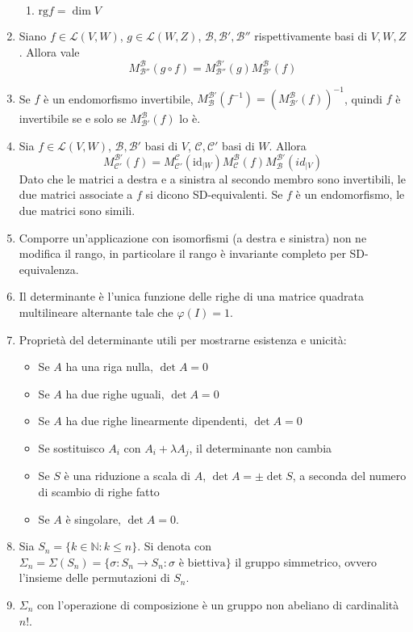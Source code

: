 \documentclass[a4paper,11pt]{article}
\newcommand{\base}[1]{\mathcal{#1}}				%
\newcommand{\rg}{\mathrm{rg}}						%
\begin{document}
\begin{enumerate}[resume]
\begin{enumerate}
		\item $\rg f=\dim V$
	\end{enumerate}
	\item Siano $f\in\mathcal{L}(V,W)$, $g\in\mathcal{L}(W,Z)$, $\base{B},\base{B'},\base{B''}$ rispettivamente basi di $V,W,Z$. Allora vale
	\[M_{\base{B''}}^{\base{B}}(g\circ f)=M_{\base{B''}}^{\base{B'}}(g)M_{\base{B'}}^{\base{B}}(f)\]
	\item Se $f$ è un endomorfismo invertibile, $M_{\base{B}}^{\base{B'}}(f^{-1})=\left(M_{\base{B'}}^{\base{B}}(f)\right)^{-1}$, quindi $f$ è invertibile se e solo se $M_{\base{B'}}^{\base{B}}(f)$ lo è.
	\item Sia $f\in\mathcal{L}(V,W)$, $\base{B},\base{B'}$ basi di $V$, $\base{C},\base{C'}$ basi di $W$. Allora
	\[M_{\base{C'}}^{\base{B'}}(f)=M_{\base{C'}}^{\base{C}}(\mathrm{id}_{|W})M_{\base{C}}^{\base{B}}(f)M_{\base{B}}^{\base{B'}}(id_{|V})\]
	Dato che le matrici a destra e a sinistra al secondo membro sono invertibili, le due matrici associate a $f$ si dicono SD-equivalenti. Se $f$ è un endomorfismo, le due matrici sono simili.
	\item Comporre un'applicazione con isomorfismi (a destra e sinistra) non ne modifica il rango, in particolare il rango è invariante completo per SD-equivalenza.
	\item Il determinante è l'unica funzione delle righe di una matrice quadrata multilineare alternante tale che $\varphi(I)=1$.
	\item Proprietà del determinante utili per mostrarne esistenza e unicità:
	\begin{itemize}
		\item Se $A$ ha una riga nulla, $\det A=0$
		\item Se $A$ ha due righe uguali, $\det A=0$
		\item Se $A$ ha due righe linearmente dipendenti, $\det A=0$
		\item Se sostituisco $A_i$ con $A_i+\lambda A_j$, il determinante non cambia
		\item Se $S$ è una riduzione a scala di $A$, $\det A=\pm \det S$, a seconda del numero di scambio di righe fatto
		\item Se $A$ è singolare, $\det A =0$.
	\end{itemize}
	\item Sia $S_n=\{k\in\mathbb{N}: k\leq n\}$. Si denota con $\Sigma_n=\Sigma(S_n)=\{\sigma\colon S_n\to S_n:\sigma\textrm{ è biettiva}\}$ il gruppo simmetrico, ovvero l'insieme delle permutazioni di $S_n$.
	\item $\Sigma_n$ con l'operazione di composizione è un gruppo non abeliano di cardinalità $n!$.

\end{enumerate}
\end{document}
